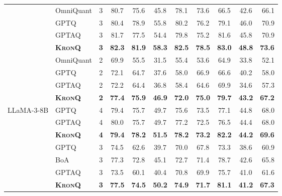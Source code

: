 \documentclass{article} %
\newcommand{\KronQ}{\textsc{KronQ}}
\begin{document}
\begin{longtable}{l||l|c|cccccccr}
\cline{2-11}
 & OmniQuant & 3 & 80.7 & 75.6 & 45.8 & 78.1 & 73.6 & 66.5 & 42.6 & 66.1 \\
 & GPTQ      & 3 & 80.4 & 78.9 & 55.8 & 80.2 & 76.2 & 79.1 & 46.0 & 70.9 \\
 & GPTAQ     & 3 & 81.7 & 77.5 & 54.4 & 79.8 & 75.2 & 81.6 & 45.8 & 70.9 \\
 & \cellcolor{gray!15}\textbf{\KronQ} & \cellcolor{gray!15}\textbf{3} & \cellcolor{gray!15}\textbf{82.3} & \cellcolor{gray!15}\textbf{81.9} & \cellcolor{gray!15}\textbf{58.3} & \cellcolor{gray!15}\textbf{82.5} & \cellcolor{gray!15}\textbf{78.5} & \cellcolor{gray!15}\textbf{83.0} & \cellcolor{gray!15}\textbf{48.8} & \cellcolor{gray!15}\textbf{73.6} \\
\cline{2-11}
 & OmniQuant & 2 & 69.9 & 55.5 & 31.5 & 55.4 & 53.6 & 64.9 & 33.8 & 52.1 \\
 & GPTQ      & 2 & 72.1 & 64.7 & 37.6 & 58.0 & 66.9 & 66.6 & 40.2 & 58.0 \\
 & GPTAQ     & 2 & 72.2 & 64.4 & 36.8 & 58.4 & 64.6 & 69.9 & 34.6 & 57.3 \\
 & \cellcolor{gray!15}\textbf{\KronQ} & \cellcolor{gray!15}\textbf{2} & \cellcolor{gray!15}\textbf{77.4} & \cellcolor{gray!15}\textbf{75.9} & \cellcolor{gray!15}\textbf{46.9} & \cellcolor{gray!15}\textbf{72.0} & \cellcolor{gray!15}\textbf{75.0} & \cellcolor{gray!15}\textbf{79.7} & \cellcolor{gray!15}\textbf{43.2} & \cellcolor{gray!15}\textbf{67.2} \\
\hline
\multirow{11}{*}{LLaMA-3-8B}
 & GPTQ  & 4 & 79.4 & 75.7 & 49.7 & 75.6 & 73.5 & 77.1 & 44.8 & 68.0 \\
 & GPTAQ & 4 & 80.0 & 75.7 & 49.7 & 77.2 & 72.5 & 76.5 & 44.4 & 68.0 \\
 & \cellcolor{gray!15}\textbf{\KronQ} & \cellcolor{gray!15}\textbf{4} & \cellcolor{gray!15}\textbf{79.4} & \cellcolor{gray!15}\textbf{78.2} & \cellcolor{gray!15}\textbf{51.5} & \cellcolor{gray!15}\textbf{78.2} & \cellcolor{gray!15}\textbf{73.2} & \cellcolor{gray!15}\textbf{82.2} & \cellcolor{gray!15}\textbf{44.2} & \cellcolor{gray!15}\textbf{69.6} \\
\cline{2-11}
 & GPTQ  & 3 & 74.5 & 62.6 & 39.7 & 70.0 & 67.8 & 73.3 & 38.6 & 60.9 \\
 & BoA   & 3 & 77.3 & 72.8 & 45.1 & 72.7 & 71.4 & 78.7 & 42.6 & 65.8 \\
 & GPTAQ & 3 & 73.5 & 60.1 & 40.4 & 70.8 & 69.9 & 75.7 & 41.0 & 61.6 \\
 & \cellcolor{gray!15}\textbf{\KronQ} & \cellcolor{gray!15}\textbf{3} & \cellcolor{gray!15}\textbf{77.5} & \cellcolor{gray!15}\textbf{74.5} & \cellcolor{gray!15}\textbf{50.2} & \cellcolor{gray!15}\textbf{74.9} & \cellcolor{gray!15}\textbf{71.7} & \cellcolor{gray!15}\textbf{81.1} & \cellcolor{gray!15}\textbf{41.2} & \cellcolor{gray!15}\textbf{67.3} \\

\end{longtable}
\end{document}
